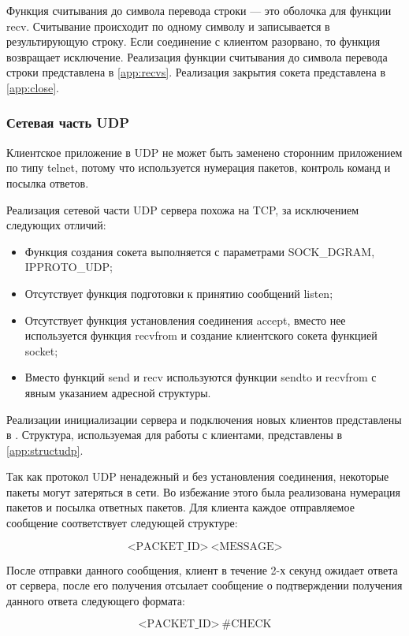 Функция считывания до символа перевода строки --- это оболочка для функции recv. Считывание происходит по одному символу и записывается в результирующую строку. Если соединение с клиентом разорвано, то функция возвращает исключение. Реализация функции считывания до символа перевода строки представлена в \vref{app:recvs}. Реализация закрытия сокета представлена в \vref{app:close}.

\subsubsection{Сетевая часть UDP}

Клиентское приложение в UDP не может быть заменено сторонним приложением по типу telnet, потому что используется нумерация пакетов, контроль команд и посылка ответов.

Реализация сетевой части UDP сервера похожа на TCP, за исключением следующих отличий:

\begin{itemize}
	\item Функция создания сокета выполняется с параметрами SOCK\_DGRAM, IPPROTO\_UDP;
	\item Отсутствует функция подготовки к принятию сообщений listen;
	\item Отсутствует функция установления соединения accept, вместо нее используется функция recvfrom и создание клиентского сокета функцией socket;
	\item Вместо функций send и recv используются функции sendto и recvfrom с явным указанием адресной структуры.
\end{itemize}

Реализации инициализации сервера и подключения новых клиентов представлены в . Структура, используемая для работы с клиентами, представлены в \vref{app:structudp}.

Так как протокол UDP ненадежный и без установления соединения, некоторые пакеты могут затеряться в сети. Во избежание этого была реализована нумерация пакетов и посылка ответных пакетов. Для клиента каждое отправляемое сообщение соответствует следующей структуре:

\[\text{<PACKET\_ID>} ~ \text{<MESSAGE>}\]

После отправки данного сообщения, клиент в течение 2-х секунд ожидает ответа от сервера, после его получения отсылает сообщение о подтверждении получения данного ответа следующего формата:

\[\text{<PACKET\_ID>} ~ \text{\#CHECK}\]

